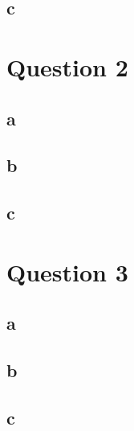 \documentclass{article}
\begin{document}
\subsection{c}
\section{Question 2}
\subsection{a}
\subsection{b}
\subsection{c}
\section{Question 3}
\subsection{a}
\subsection{b}
\subsection{c}
\end{document}
